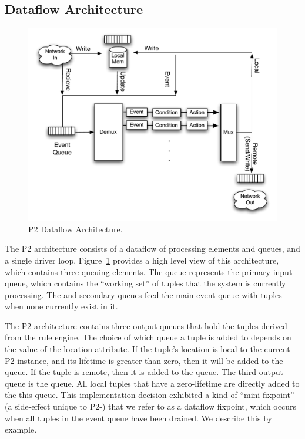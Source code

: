 \subsection{Dataflow Architecture}
\label{ch:p2:sec:dataflow}

\begin{figure} 
\ssp
\begin{center}
\includegraphics[scale=0.6]{figures/p2-arch}
\caption{\label{ch:p2:fig:dataflow}P2 Dataflow Architecture.}
\end{center} 
\end{figure}

The P2 architecture consists of a dataflow of processing elements and queues,
and a single driver loop.  Figure~\ref{ch:p2:fig:dataflow} provides a high
level view of this architecture, which contains three queuing elements.  The
 queue represents the primary input queue, which contains the
``working set'' of tuples that the system is currently processing.  The
 and  secondary queues feed the main event queue with
tuples when none currently exist in it.

The P2 architecture contains three output queues that hold the tuples derived
from the rule engine.  The choice of which queue a tuple is added to depends on
the value of the location attribute.  If the tuple's location is local to the
current P2 instance, and its lifetime is greater than zero, then it will be
added to the  queue.  If the tuple is remote, then it is added to
the  queue.  The third output queue is the  queue.  All
local tuples that have a zero-lifetime are directly added to the this queue.
This implementation decision exhibited a kind of ``mini-fixpoint'' (a side-effect 
unique to P2-\OVERLOG) that we refer to as a dataflow fixpoint, which
occurs when all tuples in the event queue have been drained.  We describe this
by example.

